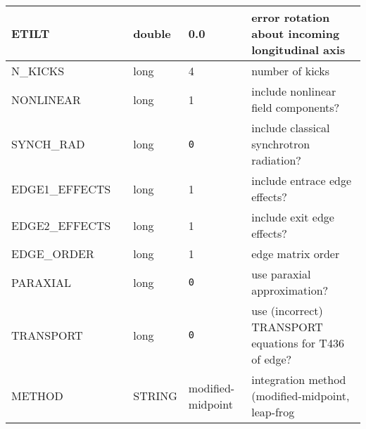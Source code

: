 \begin{tabular}{|l|l|l|l|p{\descwidth}|}
ETILT &  & double &  0.0 & error rotation about incoming longitudinal axis  \\ \hline 
N\_KICKS &  & long &   4               & number of kicks  \\ \hline 
NONLINEAR &  & long &   1               & include nonlinear field components?  \\ \hline 
SYNCH\_RAD &  & long &  \verb|0| & include classical synchrotron radiation?  \\ \hline 
EDGE1\_EFFECTS &  & long &   1               & include entrace edge effects?  \\ \hline 
EDGE2\_EFFECTS &  & long &   1               & include exit edge effects?  \\ \hline 
EDGE\_ORDER &  & long &   1               & edge matrix order  \\ \hline 
PARAXIAL &  & long &  \verb|0| & use paraxial approximation?  \\ \hline 
TRANSPORT &  & long &  \verb|0| & use (incorrect) TRANSPORT equations for T436 of edge?  \\ \hline 
METHOD &  & STRING &   modified-midpoint & integration method (modified-midpoint, leap-frog  \\ \hline 
\end{tabular}

